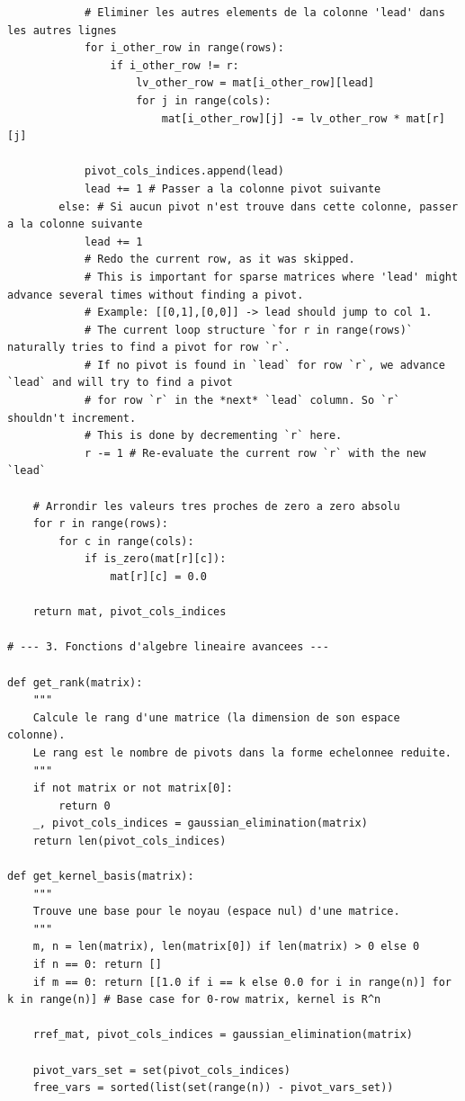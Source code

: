 \documentclass{report}
\begin{document}
\begin{verbatim}
            # Eliminer les autres elements de la colonne 'lead' dans les autres lignes
            for i_other_row in range(rows):
                if i_other_row != r:
                    lv_other_row = mat[i_other_row][lead]
                    for j in range(cols):
                        mat[i_other_row][j] -= lv_other_row * mat[r][j]

            pivot_cols_indices.append(lead)
            lead += 1 # Passer a la colonne pivot suivante
        else: # Si aucun pivot n'est trouve dans cette colonne, passer a la colonne suivante
            lead += 1
            # Redo the current row, as it was skipped.
            # This is important for sparse matrices where 'lead' might advance several times without finding a pivot.
            # Example: [[0,1],[0,0]] -> lead should jump to col 1.
            # The current loop structure `for r in range(rows)` naturally tries to find a pivot for row `r`.
            # If no pivot is found in `lead` for row `r`, we advance `lead` and will try to find a pivot
            # for row `r` in the *next* `lead` column. So `r` shouldn't increment.
            # This is done by decrementing `r` here.
            r -= 1 # Re-evaluate the current row `r` with the new `lead`

    # Arrondir les valeurs tres proches de zero a zero absolu
    for r in range(rows):
        for c in range(cols):
            if is_zero(mat[r][c]):
                mat[r][c] = 0.0

    return mat, pivot_cols_indices

# --- 3. Fonctions d'algebre lineaire avancees ---

def get_rank(matrix):
    """
    Calcule le rang d'une matrice (la dimension de son espace colonne).
    Le rang est le nombre de pivots dans la forme echelonnee reduite.
    """
    if not matrix or not matrix[0]:
        return 0
    _, pivot_cols_indices = gaussian_elimination(matrix)
    return len(pivot_cols_indices)

def get_kernel_basis(matrix):
    """
    Trouve une base pour le noyau (espace nul) d'une matrice.
    """
    m, n = len(matrix), len(matrix[0]) if len(matrix) > 0 else 0
    if n == 0: return []
    if m == 0: return [[1.0 if i == k else 0.0 for i in range(n)] for k in range(n)] # Base case for 0-row matrix, kernel is R^n

    rref_mat, pivot_cols_indices = gaussian_elimination(matrix)

    pivot_vars_set = set(pivot_cols_indices)
    free_vars = sorted(list(set(range(n)) - pivot_vars_set))


\end{verbatim}
\end{document}
